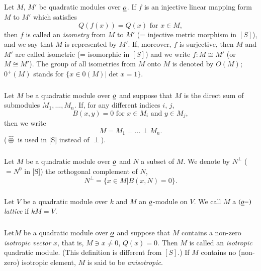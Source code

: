 \subsection{}\label{c2:subsec2.0.2}
Let $M$, $M'$ be quadratic modules over $\underline{o}$. If $f$ is
  an injective linear mapping form $M$ to $M'$ which satisfies
$$
Q(f(x))=Q(x)\text{ \ for \ } x\in M,
$$
then $f$ is called an {\em isometry} from $M$ to $M'$ (= injective
metric morphism in $[S]$), and we say that $M$ is represented by
$M'$. If, moreover, $f$ is surjective, then $M$ and $M'$ are called
isometric (= isomorphic in $[S]$) and we write $f:M\cong M'$ (or $M\cong
M'$). The group of all isometries from $M$ onto $M$ is denoted by
$O(M)$; $0^{+}(M)$ stands for $\{x\in 0(M)|\det x=1\}$.


\subsubsection{}\label{c2:subsec2.0.3}
Let $M$ be a quadratic module over $\underline{o}$ and suppose that
$M$ is the direct sum of submodules $M_{1},\ldots,M_{n}$. If, for any
different indices $i$, $j$,
$$
B(x,y)=0\text{ \ for \ } x\in M_{i}\text{ \ and \ } y\in M_{j},
$$
then we write
$$
M=M_{1}\perp \ldots\perp M_{n}.
$$
($\hat{\oplus}$ is used in [S] instead of $\perp$).

\subsubsection{}\label{c2:subsec2.0.4}
Let $M$ be a quadratic module over $\underline{o}$ and $N$ a subset
  of $M$. We denote by $N^{\perp}$ ($=N^{0}$ in [S]) the orthogonal
  complement of $N$, \iec
$$
N^{\perp}=\{x\in M|B(x,N)=0\}.
$$

\subsubsection{}\label{c2:subsec2.0.5}
Let $V$ be a quadratic module over $k$ and $M$ an
$\underline{o}$-module on $V$. We call $M$ a $(\underline{o}-)$ {\em lattice} if
$kM=V$. 

\subsubsection{}\label{c2:subsec2.0.6}
Let\pageoriginale $M$ be a quadratic module over $\underline{o}$ and suppose
that $M$ contains a non-zero {\em isotropic vector} $x$, that is,
$M\ni x\neq 0$, $Q(x)=0$. Then $M$ is called an {\em isotropic}
quadratic module. (This definition is different from $[S]$.) If $M$
contains no (non-zero) isotropic element, $M$ is said to be {\em
  anisotropic}. 

